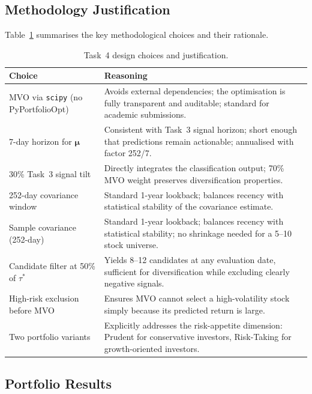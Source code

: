 \documentclass[12pt, a4paper]{article}
\begin{document}
\subsection{Methodology Justification}

Table~\ref{tab:t4_justification} summarises the key methodological
choices and their rationale.

\begin{table}[h]
\centering
\caption{Task~4 design choices and justification.}
\label{tab:t4_justification}
\renewcommand{\arraystretch}{1.4}
\begin{tabular}{p{4.5cm}p{8cm}}
\hline
\textbf{Choice} & \textbf{Reasoning} \\
\hline
MVO via \texttt{scipy} (no PyPortfolioOpt)
  & Avoids external dependencies; the optimisation is fully
    transparent and auditable; standard for academic submissions. \\
7-day horizon for $\boldsymbol{\mu}$
  & Consistent with Task~3 signal horizon; short enough that
    predictions remain actionable; annualised with factor 252/7. \\
30\% Task~3 signal tilt
  & Directly integrates the classification output; 70\% MVO
    weight preserves diversification properties. \\
252-day covariance window
  & Standard 1-year lookback; balances recency with statistical
    stability of the covariance estimate. \\
Sample covariance (252-day)
  & Standard 1-year lookback; balances recency with statistical
    stability; no shrinkage needed for a 5--10 stock universe. \\
Candidate filter at 50\% of $\tau^*$
  & Yields 8--12 candidates at any evaluation date, sufficient
    for diversification while excluding clearly negative signals. \\
High-risk exclusion before MVO
  & Ensures MVO cannot select a high-volatility stock simply
    because its predicted return is large. \\
Two portfolio variants
  & Explicitly addresses the risk-appetite dimension:
    Prudent for conservative investors, Risk-Taking for
    growth-oriented investors. \\
\hline
\end{tabular}
\end{table}

\subsection{Portfolio Results}
\end{document}

